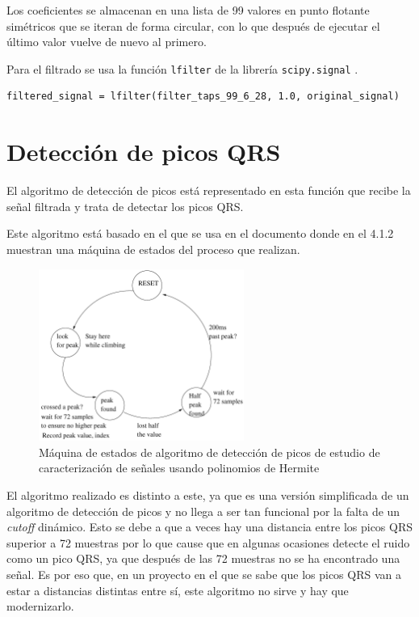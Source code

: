 Los coeficientes se almacenan en una lista de 99 valores en punto flotante simétricos que se iteran de forma circular, con lo que después de ejecutar el último valor vuelve de nuevo al primero.  

Para el filtrado se usa la función \lstinline{lfilter} de la librería \lstinline{scipy.signal} \cite{SciPy}.

\lstset{language=python, breaklines=true, basicstyle=\footnotesize}
\begin{lstlisting}[frame=single]
    filtered_signal = lfilter(filter_taps_99_6_28, 1.0, original_signal)
\end{lstlisting}

\section{Detección de picos QRS}

El algoritmo de detección de picos está representado en esta función que recibe la señal filtrada y trata de detectar los picos QRS.

Este algoritmo está basado en el que se usa en el documento \cite{desai2021low} donde en el 4.1.2 muestran una máquina de estados del proceso que realizan.

\begin{figure}[h!]
    \centering
    \includegraphics[width=0.6\textwidth]{./Images/img_algoritmo/fsm_mdpi.png}
    \caption{Máquina de estados de algoritmo de detección de picos de estudio de caracterización de señales usando polinomios de Hermite \cite{desai2021low}}
    \label{fig:fsm_mpdi}
\end{figure}

El algoritmo realizado es distinto a este, ya que es una versión simplificada de un algoritmo de detección de picos y no llega a ser tan funcional por la falta de un \textit{cutoff} dinámico. Esto se debe a que a veces hay una distancia entre los picos QRS superior a 72 muestras por lo que cause que en algunas ocasiones detecte el ruido como un pico QRS, ya que después de las 72 muestras no se ha encontrado una señal. Es por eso que, en un proyecto en el que se sabe que los picos QRS van a estar a distancias distintas entre sí, este algoritmo no sirve y hay que modernizarlo.

